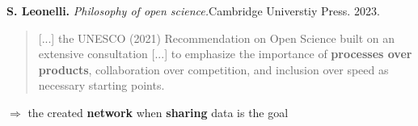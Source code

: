 \documentclass[10pt,compress,serif,aspectratio=169]{beamer}
\begin{document}
% 
% 
% 
% 


\begin{frame}{\textbf{S. Leonelli.} \textit{Philosophy of open science.}}{Cambridge Universtiy Press. 2023.}

	\large{
		\begin{quote}
			[...] the UNESCO (2021) Recommendation on Open Science built on
			an extensive consultation [...] to emphasize the importance of
			\textbf{\huge{processes over products}},
			collaboration over competition, and
			inclusion over speed as necessary starting points.
		\end{quote}
	}
	\vfill

	\pause
	{\huge
		$\Rightarrow$ the created \textbf{network} when \textbf{sharing} data is the goal
	}

\end{frame}
\end{document}
